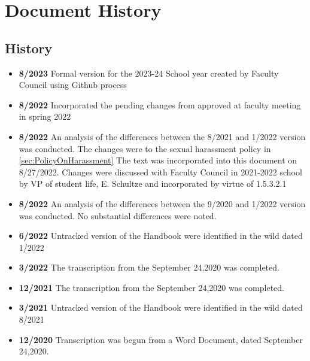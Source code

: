 \section{Document History}
	\subsection{History}
		\begin{itemize}
			\item{{\bfseries 8/2023} Formal version for the 2023-24 School year created by Faculty Council using Github process }
			\item{{\bfseries 8/2022} Incorporated the pending changes from approved at faculty meeting in spring 2022}
			\item{{\bfseries 8/2022} An analysis of the differences between the 8/2021 and 1/2022 version was conducted.
				The changes were to the sexual harassment policy in
				\ref{sec:PolicyOnHarassment}
				The text was incorporated into this document on 8/27/2022.
				Changes
				were discussed with Faculty Council in 2021-2022 school by VP of student life, E. Schultze and incorporated by virtue of 1.5.3.2.1
			}
			\item{{\bfseries 8/2022} An analysis of the differences between the 9/2020 and 1/2022 version was conducted. No substantial differences were noted.}
			\item{{\bfseries 6/2022} Untracked version of the Handbook were identified in the wild dated 1/2022}
			\item{{\bfseries 3/2022} The transcription from the September 24,2020 was completed.}
			\item{{\bfseries 12/2021} The transcription from the September 24,2020 was completed.}
			\item{{\bfseries 3/2021} Untracked version of the Handbook were identified in the wild dated 8/2021}
			\item{{\bfseries 12/2020} Transcription was begun from a Word Document, dated September 24,2020.}
		\end{itemize}